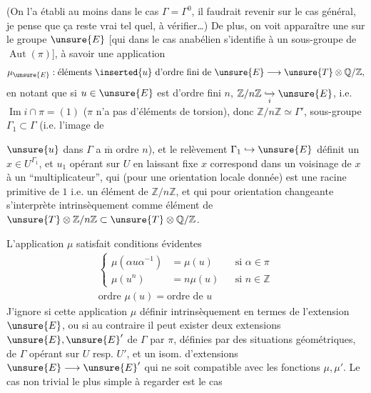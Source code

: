 (On l'a établi  au moins dans le cas
\(\Gamma=\Gamma^0\), il faudrait revenir sur le cas général,
je pense que ça reste vrai tel quel, à vérifier\ldots)
\margin{\unsure{!}}
De plus, on voit apparaître une 
sur le groupe \(\unsure{E}\)
[qui dans le cas anabélien s'identifie à un sous-groupe de
\(\operatorname{Aut}(\pi)\)], à savoir une application
\[
\mu_{\unsure{E}}:
\text{éléments }\inserted{u}\text{ d'ordre fini de }\unsure{E}
\longrightarrow \unsure{T}\otimes\mathbb Q/\mathbb Z,
\]
 en notant que si \(u\in\unsure{E}\) est d'ordre fini
\(n\),  \(\mathbb Z/n\mathbb Z\lhook\joinrel\xrightarrow[i]{}
\unsure{E}\), i.e. \(\operatorname{Im}i\cap\pi=(1)\)
(\(\pi\) n'a pas d'éléments de torsion), donc
\(\mathbb Z/n\mathbb Z\simeq\Gamma'\),  sous-groupe
\(\Gamma_1\subset\Gamma\) (i.e. l'image de



\(\unsure{u}\) dans \(\Gamma\) a \(\overline{\mathrm m}\) ordre \(n\)),
et le relèvement \(\Gamma_1\hookrightarrow\unsure{E}\) définit un
\(x\in U^{\Gamma_1}\),  et \(u_1\) opérant sur \(U\)
en laissant fixe \(x\) correspond dans un voisinage de \(x\) à un
``multiplicateur'', qui (pour une orientation locale donnée) est une
racine primitive  de \(1\) i.e. un élément de
\(\mathbb Z/n\mathbb Z\), et qui pour orientation changeante
s'interprète intrinsèquement comme élément de
\(\unsure{T}\otimes\mathbb Z/n\mathbb Z
\subset\unsure{T}\otimes\mathbb Q/\mathbb Z\).

L'application \(\mu\) satisfait  conditions évidentes
\[
\begin{gathered}
\left\{
\begin{aligned}
\mu(\alpha u\alpha^{-1})&=\mu(u) &&\text{si }\alpha\in\pi\\
\mu(u^n)&=n\mu(u) &&\text{si }n\in\mathbb Z
\end{aligned}
\right.\\
\text{ordre }\mu(u)=\text{ordre de }u
\end{gathered}
\]
J'ignore si cette application \(\mu\) 
 définir intrinsèquement en termes de l'extension
\(\unsure{E}\), ou si au contraire il peut exister deux extensions
 \(\unsure{E},\unsure{E}'\) de \(\Gamma\) par \(\pi\),
définies par des situations géométriques, de \(\Gamma\) opérant sur
\(U\) resp. \(U'\), et un isom. d'extensions
\(\unsure{E}\longrightarrow\unsure{E}'\) qui ne soit compatible avec
les fonctions \(\mu,\mu'\).
Le cas non trivial le plus simple à regarder est le cas

